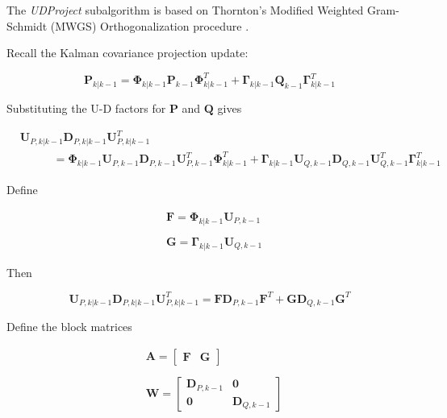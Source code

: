 The \textit{UDProject} subalgorithm is based on Thornton’s Modified Weighted Gram-Schmidt (MWGS)
Orthogonalization procedure \cite{thornton1976}.

Recall the Kalman covariance projection update:

\begin{equation*}
    \mathbf{P}_{k|k-1} = \mathbf{\Phi}_{k|k-1} \mathbf{P}_{k-1} \mathbf{\Phi}_{k|k-1}^T + \mathbf{\Gamma}_{k|k-1} \mathbf{Q}_{k-1} \mathbf{\Gamma}_{k|k-1}^T
\end{equation*}

Substituting the U-D factors for $\mathbf{P}$ and $\mathbf{Q}$ gives

\begin{equation*}
    \begin{aligned}
        & \mathbf{U}_{P,k|k-1} \mathbf{D}_{P,k|k-1} \mathbf{U}_{P,k|k-1}^T \\
        & \phantom{MMM} = \mathbf{\Phi}_{k|k-1} \mathbf{U}_{P,k-1} \mathbf{D}_{P,k-1} \mathbf{U}_{P,k-1}^T \mathbf{\Phi}_{k|k-1}^T
        + \mathbf{\Gamma}_{k|k-1} \mathbf{U}_{Q,k-1} \mathbf{D}_{Q,k-1} \mathbf{U}_{Q,k-1}^T \mathbf{\Gamma}_{k|k-1}^T
    \end{aligned}
\end{equation*}

Define

\begin{equation*}
    \begin{aligned}
        & \mathbf{F} = \mathbf{\Phi}_{k|k-1} \mathbf{U}_{P,k-1} \\
        &\phantom{.} \\
        & \mathbf{G} = \mathbf{\Gamma}_{k|k-1} \mathbf{U}_{Q,k-1}
    \end{aligned}
\end{equation*}

Then

\begin{equation*}
    \mathbf{U}_{P,k|k-1} \mathbf{D}_{P,k|k-1} \mathbf{U}_{P,k|k-1}^T
    = \mathbf{F} \mathbf{D}_{P,k-1} \mathbf{F}^T
    + \mathbf{G} \mathbf{D}_{Q,k-1} \mathbf{G}^T
\end{equation*}

Define the block matrices

\begin{equation*}
    \begin{aligned}
        &\mathbf{A} =
        \begin{bmatrix}
         \mathbf{F} & \mathbf{G}
        \end{bmatrix} \\
        &\phantom{.} \\
        &\mathbf{W} =
        \begin{bmatrix}
         \mathbf{D}_{P,k-1} & \mathbf{0} \\
         \mathbf{0} & \mathbf{D}_{Q,k-1}
        \end{bmatrix}
    \end{aligned}
\end{equation*}

